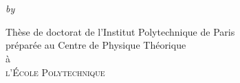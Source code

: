 \begin{titlepage}
  \vspace*{3cm}
  \makeatletter
  \begin{center}
    \begin{huge}
      \@title
    \end{huge}\\[1.15em]
    \ifdefined \r@subtitle
    \begin{Large}
      \@subtitle
    \end{Large}\\[0.6em]
    \fi
    \emph{by}\\[0.6em]
    \@author
    \vfill
    
    {\large Thèse de doctorat de l'Institut Polytechnique de Paris\\
    préparée au Centre de Physique Théorique\\
    à\\
    \textsc{l'École Polytechnique}}
   
  \end{center}
  \makeatother
\end{titlepage}

\restoregeometry

\newpage
\null
\thispagestyle{empty}
\newpage
